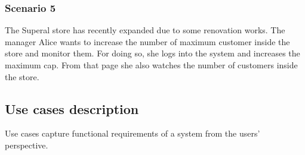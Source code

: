 \subsubsection{Scenario 5}\label{sc:fifth}
The Superal store has recently expanded due to some renovation works. The manager Alice wants to increase the number of maximum customer inside the store and monitor them.\newline
For doing so, she logs into the system and increases the maximum cap. From that page she also watches the number of customers inside the store.

\clearpage
\subsection{Use cases description}
Use cases capture functional requirements of a system from the users' perspective.

